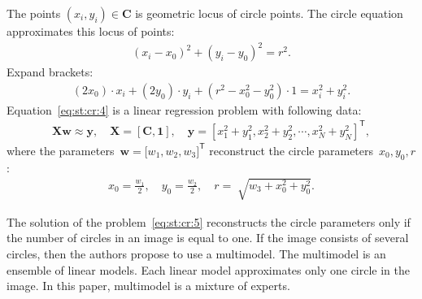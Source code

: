 \documentclass[12pt, twoside]{article}
\begin{document}
The points $\left(x_i, y_i\right)\in\textbf{C}$ is geometric locus of circle points. 
The circle equation approximates this locus of points:
\[
\label{eq:st:cr:3}
\begin{aligned}
\left(x_i - x_0\right)^{2}+\left(y_i-y_0\right)^2 = r^2.
\end{aligned}
\]
Expand brackets:
\[
\label{eq:st:cr:4}
\begin{aligned}
(2x_0)\cdot x_i + (2y_0)\cdot y_i+(r^2-x_0^2-y_0^2)\cdot1 = x_{i}^2 + y_{i}^2.
\end{aligned}
\]
Equation~\eqref{eq:st:cr:4} is a linear regression problem with following data:
\[
\label{eq:st:cr:5}
\begin{aligned}
\textbf{X}\textbf{w} \approx \textbf{y},  \quad \textbf{X} = \left[\textbf{C}, \textbf{1}\right], \quad \textbf{y} = [x_1^2+y_1^2, x_2^2+y_2^2, \cdots, x_N^2+y_N^2]^{\mathsf{T}},
\end{aligned}
\]
where the parameters~$\textbf{w} = \bigr[w_1, w_2, w_3\bigr]^{\mathsf{T}}$ reconstruct the circle parameters~$x_0, y_0, r$:
\[
\label{eq:st:cr:6}
\begin{aligned}
x_0 = \frac{w_1}{2}, \quad y_0 = \frac{w_2}{2}, \quad r = \sqrt[]{w_3+x_{0}^{2}+y_{0}^{2}}.
\end{aligned}
\]

The solution of the problem~\eqref{eq:st:cr:5} reconstructs the circle parameters only if the number of circles in an image is equal to one.
If the image consists of several circles, then the authors propose to use a multimodel.
The multimodel is an ensemble of linear models.
Each linear model approximates only one circle in the image.
In this paper, multimodel is a mixture of experts.
\end{document}
